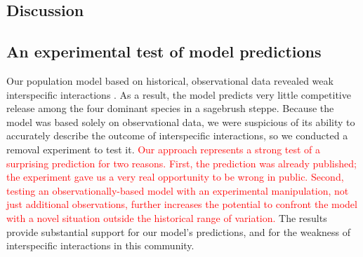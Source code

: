 \documentclass[11pt]{article}
\newcommand{\new}{\textcolor{red}}
\begin{document}
\begin{doublespacing}
\section*{Discussion}

\subsection*{An experimental test of model predictions}

Our population model based on historical, observational data revealed weak interspecific interactions \citep{adler_coexistence_2010,chu_large_2015}. As a result, the model predicts very little competitive release among the four dominant species in a sagebrush steppe. 
Because the model was based solely on observational
data, we were suspicious of its ability to accurately describe the outcome of interspecific interactions, so we conducted a removal experiment to test it. 
\new{Our approach represents a strong test of a surprising prediction for two reasons. First, the prediction was already published; the experiment 
gave us a very real opportunity to be wrong in public. Second, testing an observationally-based model with an experimental manipulation, 
not just additional observations, further increases the potential to confront the model with a novel situation outside the historical range of variation.}
The results provide substantial support for our model's predictions, and for the weakness of interspecific interactions in this community. 


\end{doublespacing}
\end{document}
